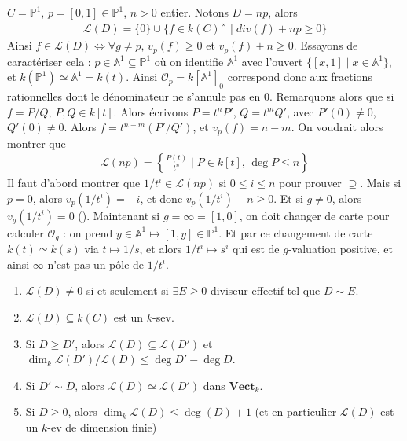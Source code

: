         \begin{expl}
            $C = \mathbb{P}^1$, $p = [0,1] \in \mathbb{P}^1$, $n > 0$ entier. Notons $D = np$, alors 
            \begin{align*}
                \mathcal{L}(D) = \{0\} \cup \{f \in k(C)^\times \mid div(f) + np \geq 0\}
            \end{align*}
            Ainsi $f \in \mathcal{L}(D) \iff \forall g \neq p,\, v_p(f) \geq 0$ et $v_p(f) + n \geq 0$. Essayons de caractériser cela : $p \in \mathbb{A}^1 \subseteq \mathbb{P}^1$ où on identifie $\mathbb{A}^1$ avec l'ouvert $\{[x,1] \mid x \in \mathbb{A}^1\}$, et $k(\mathbb{P}^1) \simeq \mathbb{A}^1 = k(t)$. Ainsi $\mathcal{O}_p = k[\mathbb{A}^1]_0$ correspond donc aux fractions rationnelles dont le dénominateur ne s'annule pas en $0$. Remarquons alors que si $f = P/Q$, $P,Q \in k[t]$. Alors écrivons $P = t^nP'$, $Q = t^m Q'$, avec $P'(0) \neq 0$, $Q'(0) \neq 0$. Alors $f = t^{n - m}(P'/Q')$, et $v_p(f) = n - m$. On voudrait alors montrer que 
            \begin{align*}
                \mathcal{L}(np) = \left\{ \frac{P(t)}{t^n} \mid P \in k[t],\, \deg P \leq n \right\}
            \end{align*}
            Il faut d'abord montrer que $1/t^i \in \mathcal{L}(np)$ si $0 \leq i \leq n$ pour prouver $\supseteq$. Mais si $p = 0$, alors $v_p(1/t^i) = -i$, et donc $v_p(1/t^i) + n \geq 0$. Et si $g \neq 0$, alors $v_g(1/t^i) = 0$ (). Maintenant si $g = \infty = [1,0]$, on doit changer de carte pour calculer $\mathcal{O}_g$ : on prend $y \in \mathbb{A}^1 \mapsto [1,y] \in \mathbb{P}^1$. Et par ce changement de carte $k(t) \simeq k(s)$ via $t \mapsto 1/s$, et alors $1/t^i \mapsto s^i$ qui est de $g$-valuation positive, et ainsi $\infty$ n'est pas un pôle de $1/t^i$. 
        \end{expl}
        \begin{prop}
            \begin{enumerate}
                \item $\mathcal{L}(D) \neq 0$ si et seulement si $\exists E \geq 0$ diviseur effectif tel que $D \sim E$.
                \item $\mathcal{L}(D) \subseteq k(C)$ est un $k$-sev.
                \item Si $D \geq D'$, alors $\mathcal{L}(D) \subseteq \mathcal{L}(D')$ et $\dim_k \mathcal{L}(D')/\mathcal{L}(D) \leq \deg D' - \deg D$.
                \item Si $D' \sim D$, alors $\mathcal{L}(D) \simeq \mathcal{L}(D')$ dans $\mathbf{Vect}_k$.
                \item Si $D \geq 0$, alors $\dim_k \mathcal{L}(D) \leq \deg(D) + 1$ (et en particulier $\mathcal{L}(D)$ est un $k$-ev de dimension finie)
            \end{enumerate}
        \end{prop}

